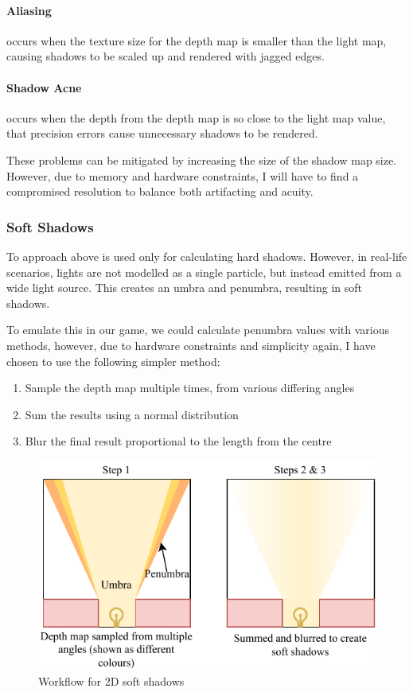 \documentclass[../main/main.tex]{subfiles}
\begin{document}
\paragraph{Aliasing} occurs when the texture size for the depth map is smaller than the light map, causing shadows to be scaled up and rendered with jagged edges.

\paragraph{Shadow Acne} occurs when the depth from the depth map is so close to the light map value, that precision errors cause unnecessary shadows to be rendered.

\bigskip

\noindent These problems can be mitigated by increasing the size of the shadow map size. However, due to memory and hardware constraints, I will have to find a compromised resolution to balance both artifacting and acuity.

\subsubsection*{Soft Shadows}
To approach above is used only for calculating hard shadows. However, in real-life scenarios, lights are not modelled as a single particle, but instead emitted from a wide light source. This creates an umbra and penumbra, resulting in soft shadows.

To emulate this in our game, we could calculate penumbra values with various methods, however, due to hardware constraints and simplicity again, I have chosen to use the following simpler method:

\begin{enumerate}
\item Sample the depth map multiple times, from various differing angles
\item Sum the results using a normal distribution
\item Blur the final result proportional to the length from the centre
\end{enumerate}

\begin{figure}[H]
    \centering
    \includegraphics[width=0.8\columnwidth]{../design/assets/soft_shadows.pdf}
    \caption{Workflow for 2D soft shadows}
    \label{fig:soft-shadows}
\end{figure}
\end{document}
